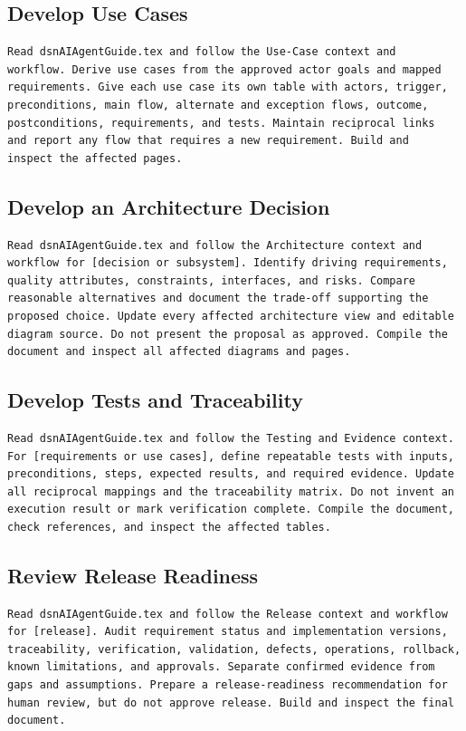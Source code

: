 \subsection{Develop Use Cases}
\begin{verbatim}
Read dsnAIAgentGuide.tex and follow the Use-Case context and
workflow. Derive use cases from the approved actor goals and mapped
requirements. Give each use case its own table with actors, trigger,
preconditions, main flow, alternate and exception flows, outcome,
postconditions, requirements, and tests. Maintain reciprocal links
and report any flow that requires a new requirement. Build and
inspect the affected pages.
\end{verbatim}

\newpage
\subsection{Develop an Architecture Decision}
\thispagestyle{fancy}
\begin{verbatim}
Read dsnAIAgentGuide.tex and follow the Architecture context and
workflow for [decision or subsystem]. Identify driving requirements,
quality attributes, constraints, interfaces, and risks. Compare
reasonable alternatives and document the trade-off supporting the
proposed choice. Update every affected architecture view and editable
diagram source. Do not present the proposal as approved. Compile the
document and inspect all affected diagrams and pages.
\end{verbatim}

\subsection{Develop Tests and Traceability}
\begin{verbatim}
Read dsnAIAgentGuide.tex and follow the Testing and Evidence context.
For [requirements or use cases], define repeatable tests with inputs,
preconditions, steps, expected results, and required evidence. Update
all reciprocal mappings and the traceability matrix. Do not invent an
execution result or mark verification complete. Compile the document,
check references, and inspect the affected tables.
\end{verbatim}

\subsection{Review Release Readiness}
\begin{verbatim}
Read dsnAIAgentGuide.tex and follow the Release context and workflow
for [release]. Audit requirement status and implementation versions,
traceability, verification, validation, defects, operations, rollback,
known limitations, and approvals. Separate confirmed evidence from
gaps and assumptions. Prepare a release-readiness recommendation for
human review, but do not approve release. Build and inspect the final
document.
\end{verbatim}

